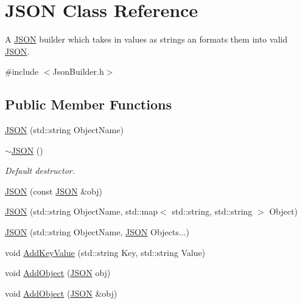\hypertarget{class_j_s_o_n}{}\section{J\+S\+ON Class Reference}
\label{class_j_s_o_n}


A \mbox{\hyperlink{class_j_s_o_n}{J\+S\+ON}} builder which takes in values as strings an formats them into valid \mbox{\hyperlink{class_j_s_o_n}{J\+S\+ON}}.  




{\ttfamily \#include $<$Json\+Builder.\+h$>$}

\subsection*{Public Member Functions}
\begin{DoxyCompactItemize}
\item 
\mbox{\hyperlink{class_j_s_o_n_a6ec05bd5385055e466d43c01b4a38e8a}{J\+S\+ON}} (std\+::string Object\+Name)
\item 
\mbox{\label{class_j_s_o_n_ad21d0848fcee452fe2434c653bc87510}} 
\mbox{\hyperlink{class_j_s_o_n_ad21d0848fcee452fe2434c653bc87510}{$\sim$\+J\+S\+ON}} ()
\begin{DoxyCompactList}\small\item\em Default destructor. \end{DoxyCompactList}\item 
\mbox{\hyperlink{class_j_s_o_n_a739debfabd82d78609f6fa8bf840ff70}{J\+S\+ON}} (const \mbox{\hyperlink{class_j_s_o_n}{J\+S\+ON}} \&obj)
\item 
\mbox{\hyperlink{class_j_s_o_n_a1f4dc2f9868c043410cb16b53933b3a7}{J\+S\+ON}} (std\+::string Object\+Name, std\+::map$<$ std\+::string, std\+::string $>$ Object)
\item 
\mbox{\hyperlink{class_j_s_o_n_a9ee23134e40c49946dafcd156944816d}{J\+S\+ON}} (std\+::string Object\+Name, \mbox{\hyperlink{class_j_s_o_n}{J\+S\+ON}} Objects...)
\item 
void \mbox{\hyperlink{class_j_s_o_n_a71082e876f9e7b1509a32b8a2f3796bd}{Add\+Key\+Value}} (std\+::string Key, std\+::string Value)
\item 
void \mbox{\hyperlink{class_j_s_o_n_a11a970ad576819bfdc48837d42e1f500}{Add\+Object}} (\mbox{\hyperlink{class_j_s_o_n}{J\+S\+ON}} obj)
\item 
void \mbox{\hyperlink{class_j_s_o_n_a28f1459b643749650cea8a20355a5038}{Add\+Object}} (\mbox{\hyperlink{class_j_s_o_n}{J\+S\+ON}} \&obj)

\end{DoxyCompactItemize}
